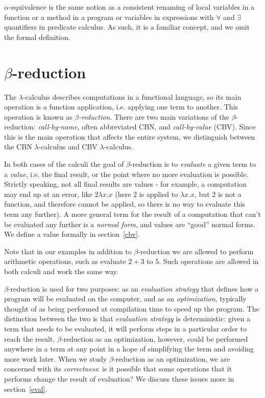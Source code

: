 \documentclass{article}
\newcommand{\lam}{\lambda}
\begin{document}
$\alpha$-equivalence is the same notion as a consistent renaming of local variables in a function or a method in a program or variables in expressions with $\forall$ and $\exists$ quantifiers in predicate calculus. As such, it is a familiar concept, and we omit the formal definition. 

\section{$\beta$-reduction}\label{beta-intro}
The $\lam$-calculus describes computations in a functional language, so its main operation is a function application, i.e. applying one term to another. This operation is known as \textit{$\beta$-reduction}. There are two main variations of the $\beta$-reduction: \textit{call-by-name}, often abbreviated CBN, and \textit{call-by-value} (CBV). Since this is the main operation that affects the entire system, we distinguish between the CBN $\lam$-calculus and CBV $\lam$-calculus. 

In both cases of the calculi the goal of $\beta$-reduction is to \textit{evaluate} a given term to a \textit{value}, i.e. the final result, or the point where no more evaluation is possible. 
Strictly speaking, not all final results are values - for example, a computation may end up at an error, like $2 \lam x. x$ (here $2$ is applied to $\lam x. x$, but $2$ is not a function, and therefore cannot be applied, so there is no way to evaluate this term any further). A more general term for the result of a computation that can't be evaluated any further is a \textit{normal form}, and values are ``good'' normal forms. 
We define a value formally in section~\ref{cbv}. 

Note that in our examples in addition to $\beta$-reduction we are allowed to perform arithmetic operations, such as evaluate $2 + 3$ to $5$. Such operations are allowed in both calculi and work the same way. 

$\beta$-reduction is used for two purposes: as an \textit{evaluation strategy} that defines how a program will be evaluated on the computer, and as an \textit{optimization}, typically thought of as being performed at compilation time to speed up the program. The distinction between the two is that \textit{evaluation strategy} is deterministic: given a term that needs to be evaluated, it will perform steps in a particular order to reach the result. $\beta$-reduction as an optimization, however, could be performed anywhere in a term at any point in a hope of simplifying the term and avoiding more work later. When we study $\beta$-reduction as an optimization, we are concerned with its \textit{correctness}: is it possible that some operations that it performs change the result of evaluation? We discuss these issues more in section~\ref{eval}.
\end{document}
